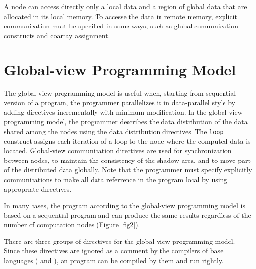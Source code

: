 
A node can access directly only a local data and a region of global data
that are allocated in its local memory.
%
To accesse the data in remote memory, explicit communication must be
specified in some ways, such as global comuunication constructs and
coarray assignment.


\section{Global-view Programming Model}

The global-view programming model is useful when, starting from
sequential version of a program, the programmer parallelizes it in
data-parallel style by adding directives incrementally with minimum 
modification.
%
In the global-view programming model, the programmer describes the data
distribution of the data shared among the nodes using the data
distribution directives.
%
The {\tt loop} construct assigns each iteration of a loop to the node
where the computed data is located. 
%
Global-view communication directives are used for synchronization
between nodes, to maintain the consistency of the shadow area, and to
move part of the distributed data globally.
%
Note that the programmer must specify explicitly communications to make
all data referrence in the program local by using appropriate directives.

In many cases, the {\XMP} program according to the global-view
programming model is based on a sequential program and can produce the
same results regardless of the number of computation nodes (Figure
\ref{fig2}).

There are three groups of directives for the global-view programming
model. Since these directives are ignored as a comment by the
compilers of base languages ({\C} and {\Fort}), an {\XMP} program can be
compiled by them and run rightly.

